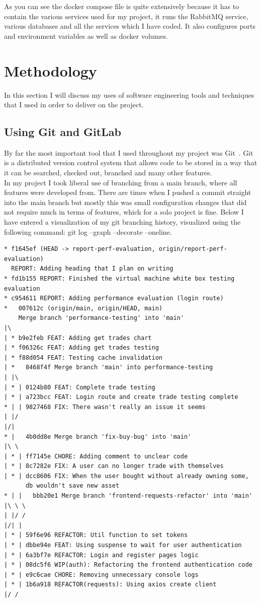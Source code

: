 \documentclass[titlepage]{article}
\begin{document}
As you can see the docker compose file is quite extensively because it has to contain the various services used for my project, it runs the RabbitMQ service, various databases and all the services which I have coded. It also configures ports and environment variables as well as docker volumes.

\pagebreak

\section{Methodology}
In this section I will discuss my uses of software engineering tools and techniques that I used in order to deliver on the project.

\subsection{Using Git and GitLab}
By far the most important tool that I used throughout my project was Git~\cite{git}. Git is a distributed version control system that allows code to be stored in a way that it can be searched, checked out, branched and many other features. \\

In my project I took liberal use of branching from a main branch, where all features were developed from. There are times when I pushed a commit straight into the main branch but mostly this was small configuration changes that did not require much in terms of features, which for a solo project is fine. Below I have entered a visualization of my git branching history, visualized using the following command: git log --graph --decorate --oneline.

\begin{verbatim}
* f1645ef (HEAD -> report-perf-evaluation, origin/report-perf-evaluation) 
  REPORT: Adding heading that I plan on writing
* fd1b155 REPORT: Finished the virtual machine white box testing evaluation
* c954611 REPORT: Adding performance evaluation (login route)
*   007612c (origin/main, origin/HEAD, main) 
    Merge branch 'performance-testing' into 'main'
|\
| * b9e2feb FEAT: Adding get trades chart
| * f06326c FEAT: Adding get trades testing
| * f88d054 FEAT: Testing cache invalidation
| *   8468f4f Merge branch 'main' into performance-testing
| |\
| * | 0124b80 FEAT: Complete trade testing
| * | a723bcc FEAT: Login route and create trade testing complete
* | | 9827468 FIX: There wasn't really an issue it seems
| |/
|/|
* |   4b0dd8e Merge branch 'fix-buy-bug' into 'main'
|\ \
| * | ff7145e CHORE: Adding comment to unclear code
| * | 8c7282e FIX: A user can no longer trade with themselves
| * | dcc8606 FIX: When the user bought without already owning some,
      db wouldn't save new asset
* | |   bbb20e1 Merge branch 'frontend-requests-refactor' into 'main'
|\ \ \
| |/ /
|/| |
| * | 59f6e96 REFACTOR: Util function to set tokens
| * | dbbe94e FEAT: Using suspense to wait for user authentication
| * | 6a3bf7e REFACTOR: Login and register pages logic
| * | 08dc5f6 WIP(auth): Refactoring the frontend authentication code
| * | e9c6cae CHORE: Removing unnecessary console logs
| * | 1b6a918 REFACTOR(requests): Using axios create client
|/ /
\end{verbatim}
\end{document}
